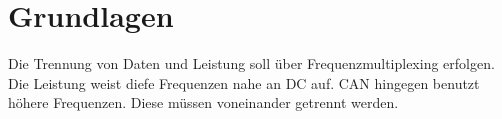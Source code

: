 \section{Grundlagen}
Die Trennung von Daten und Leistung soll über Frequenzmultiplexing erfolgen. Die Leistung weist diefe Frequenzen nahe an DC auf. CAN hingegen benutzt höhere Frequenzen. Diese müssen voneinander getrennt werden. 
